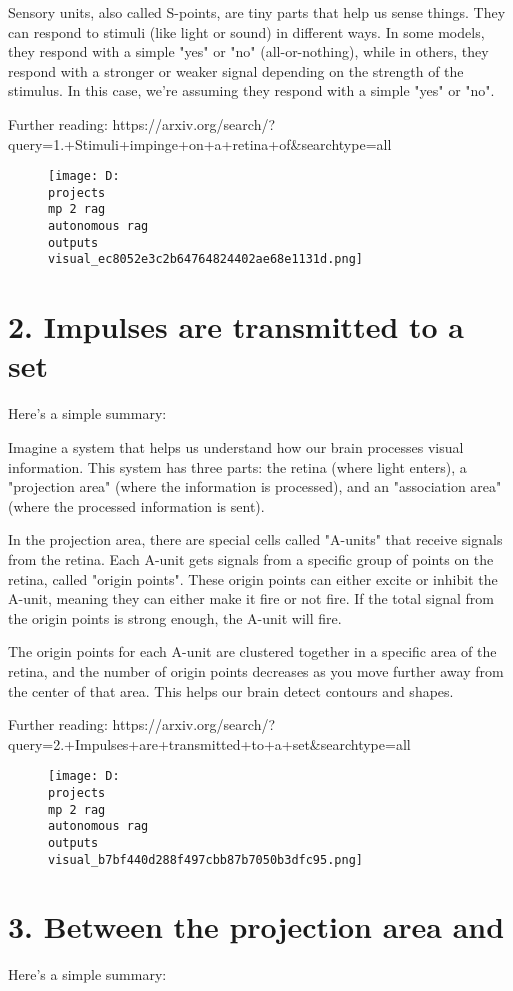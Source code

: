 \documentclass[12pt,a4paper]{article}
\begin{document}
Sensory units, also called S-points, are tiny parts that help us sense things. They can respond to stimuli (like light or sound) in different ways. In some models, they respond with a simple "yes" or "no" (all-or-nothing), while in others, they respond with a stronger or weaker signal depending on the strength of the stimulus. In this case, we're assuming they respond with a simple "yes" or "no".

Further reading: https://arxiv.org/search/?query=1.+Stimuli+impinge+on+a+retina+of&searchtype=all
\begin{figure}[h]
\centering
\texttt{[image: D:\\projects\\mp 2 rag\\autonomous rag\\outputs\\visual\_ec8052e3c2b64764824402ae68e1131d.png]}
\end{figure}
\section{2. Impulses are transmitted to a set}
Here's a simple summary:

Imagine a system that helps us understand how our brain processes visual information. This system has three parts: the retina (where light enters), a "projection area" (where the information is processed), and an "association area" (where the processed information is sent).

In the projection area, there are special cells called "A-units" that receive signals from the retina. Each A-unit gets signals from a specific group of points on the retina, called "origin points". These origin points can either excite or inhibit the A-unit, meaning they can either make it fire or not fire. If the total signal from the origin points is strong enough, the A-unit will fire.

The origin points for each A-unit are clustered together in a specific area of the retina, and the number of origin points decreases as you move further away from the center of that area. This helps our brain detect contours and shapes.

Further reading: https://arxiv.org/search/?query=2.+Impulses+are+transmitted+to+a+set&searchtype=all
\begin{figure}[h]
\centering
\texttt{[image: D:\\projects\\mp 2 rag\\autonomous rag\\outputs\\visual\_b7bf440d288f497cbb87b7050b3dfc95.png]}
\end{figure}
\section{3. Between the projection area and}
Here's a simple summary:
\end{document}
